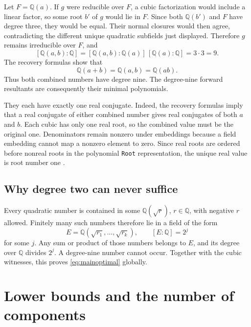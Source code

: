 \documentclass[11pt,letterpaper]{article}
\theoremstyle{definition}
\newcommand{\Q}{\mathbb Q}
\newcommand{\code}[1]{\texttt{#1}}
\begin{document}
Let $F=\Q(a)$. If $g$ were reducible over $F$, a cubic factorization would include a linear factor, so some root $b'$ of $g$ would lie in $F$. Since both $\Q(b')$ and $F$ have degree three, they would be equal. Their normal closures would then agree, contradicting the different unique quadratic subfields just displayed. Therefore $g$ remains irreducible over $F$, and
\[
 [\Q(a,b):\Q]=[\Q(a,b):\Q(a)]\,[\Q(a):\Q]=3\cdot3=9.
\]
The recovery formulas show that
\[
 \Q(a+b)=\Q(a,b)=\Q(ab).
\]
Thus both combined numbers have degree nine. The degree-nine forward resultants are consequently their minimal polynomials.

They each have exactly one real conjugate. Indeed, the recovery formulas imply that a real conjugate of either combined number gives real conjugates of both $a$ and $b$. Each cubic has only one real root, so the combined value must be the original one. Denominators remain nonzero under embeddings because a field embedding cannot map a nonzero element to zero. Since real roots are ordered before nonreal roots in the polynomial \code{Root} representation, the unique real value is root number one \cite{rootdoc}.

\subsection{Why degree two can never suffice}
Every quadratic number is contained in some $\Q(\sqrt{r})$, $r\in\Q$, with negative $r$ allowed. Finitely many such numbers therefore lie in a field of the form
\[
 E=\Q(\sqrt{r_1},\ldots,\sqrt{r_k}),\qquad [E:\Q]=2^j
\]
for some $j$. Any sum or product of those numbers belongs to $E$, and its degree over $\Q$ divides $2^j$. A degree-nine number cannot occur. Together with the cubic witnesses, this proves \eqref{eq:mainoptimal} globally.

\section{Lower bounds and the number of components}
\end{document}
